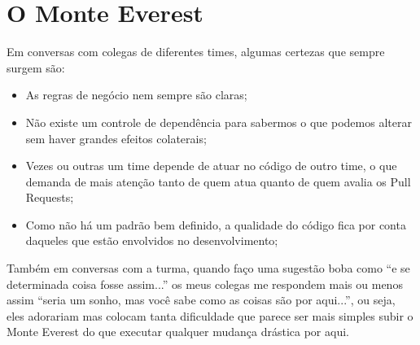 \section{O Monte Everest}

Em conversas com colegas de diferentes times, algumas certezas que sempre surgem são:
\begin{itemize}
    \item As regras de negócio nem sempre são claras;
    \item Não existe um controle de dependência para sabermos o que podemos alterar sem haver grandes efeitos colaterais;
    \item Vezes ou outras um time depende de atuar no código de outro time, o que demanda de mais atenção tanto de quem atua quanto de quem avalia os Pull Requests;
    \item Como não há um padrão bem definido, a qualidade do código fica  por conta daqueles que estão envolvidos no desenvolvimento;
\end{itemize}

Também em conversas com a turma, quando faço uma sugestão boba como ``e se determinada coisa fosse assim...'' os meus colegas me respondem mais ou menos assim ``seria um sonho, mas você sabe como as coisas são por aqui...'', ou seja, eles adorariam mas colocam tanta dificuldade que parece ser mais simples subir o Monte Everest do que executar qualquer mudança drástica por aqui.